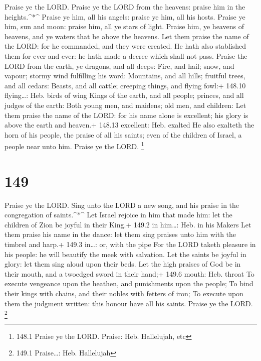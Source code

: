  Praise ye the LORD. Praise ye the LORD from the heavens:
praise him in the heights.\^{}*\^{}  Praise ye him, all his
angels: praise ye him, all his hosts.  Praise ye him, sun
and moon: praise him, all ye stars of light.  Praise him, ye
heavens of heavens, and ye waters that be above the heavens.
 Let them praise the name of the LORD: for he commanded, and
they were created.  He hath also stablished them for ever
and ever: he hath made a decree which shall not pass. 
Praise the LORD from the earth, ye dragons, and all deeps: 
Fire, and hail; snow, and vapour; stormy wind fulfilling his word:
 Mountains, and all hills; fruitful trees, and all cedars:
 Beasts, and all cattle; creeping things, and flying fowl:+
148.10 flying\ldots: Heb. birds of wing  Kings of the
earth, and all people; princes, and all judges of the earth:
 Both young men, and maidens; old men, and children:
 Let them praise the name of the LORD: for his name alone
is excellent; his glory is above the earth and heaven.+ 148.13
excellent: Heb. exalted  He also exalteth the horn of his
people, the praise of all his saints; even of the children of Israel, a
people near unto him. Praise ye the LORD. \footnote{148.1 Praise ye the
  LORD. Praise: Heb. Hallelujah, etc}

\hypertarget{section-149}{%
\section{149}\label{section-149}}

 Praise ye the LORD. Sing unto the LORD a new song, and his
praise in the congregation of saints.\^{}*\^{}  Let Israel
rejoice in him that made him: let the children of Zion be joyful in
their King.+ 149.2 in him\ldots: Heb. in his Makers  Let
them praise his name in the dance: let them sing praises unto him with
the timbrel and harp.+ 149.3 in\ldots: or, with the pipe 
For the LORD taketh pleasure in his people: he will beautify the meek
with salvation.  Let the saints be joyful in glory: let them
sing aloud upon their beds.  Let the high praises of God be
in their mouth, and a twoedged sword in their hand;+ 149.6 mouth: Heb.
throat  To execute vengeance upon the heathen, and
punishments upon the people;  To bind their kings with
chains, and their nobles with fetters of iron;  To execute
upon them the judgment written: this honour have all his saints. Praise
ye the LORD. \footnote{149.1 Praise\ldots: Heb. Hallelujah}

